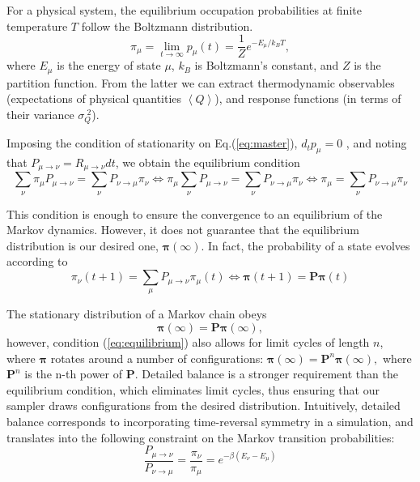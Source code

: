 For a physical system, the equilibrium occupation probabilities at finite temperature $T$ follow the Boltzmann distribution.
\begin{equation}
\pi_\mu = \lim_{t \rightarrow \infty} p_\mu (t) = \frac{1}{Z} e^{ - E_\mu / k_B T} ,
\end{equation}
where $E_\mu$ is the energy of state $\mu$, $k_B$ is Boltzmann's constant, and $Z$ is the partition function. From the latter we can extract thermodynamic observables (expectations of physical quantities $\left\langle Q \right\rangle$), and response functions (in terms of their variance $\sigma_Q^{\,\, 2}$).

Imposing the condition of stationarity on Eq.(\ref{eq:master}), $d_t p_\mu = 0$ , and noting that $ P_{\mu\rightarrow \nu} = R_{\mu\rightarrow \nu}  dt$, we obtain the equilibrium condition
\begin{equation}\label{eq:equilibrium}
\sum_\nu \pi_\mu P_{\mu \rightarrow \nu} = \sum_\nu P_{\nu \rightarrow \mu} \pi_\nu \iff \pi_\mu \sum_\nu P_{\mu \rightarrow \nu} = \sum_\nu P_{\nu \rightarrow \mu} \pi_\nu \iff \pi_\mu = \sum_\nu P_{\nu \rightarrow \mu} \pi_\nu
\end{equation}

This condition is enough to ensure the convergence to an equilibrium of the Markov dynamics.
However, it does not guarantee that the equilibrium distribution is our desired one, $\bm \pi ( \infty)$.
In fact, the probability of a state evolves according to
\begin{equation}
\pi_\nu ( t + 1 ) = \sum_\mu P_{\mu\rightarrow\nu}  \pi_\mu ( t ) \iff \bm \pi ( t + 1 ) = \bm P \bm \pi ( t )
\end{equation}

The stationary distribution of a Markov chain obeys
\begin{equation}
\bm \pi ( \infty ) = \bm P \bm \pi ( \infty ) ,
\end{equation}
however, condition (\ref{eq:equilibrium}) also allows  for limit cycles of length $n$, where $\bm \pi$ rotates around a number of configurations: $
\bm \pi ( \infty ) = \bm P^n \bm \pi ( \infty ) ,
$
 where $\bm P^n$ is the n-th power of $\bm P$.
Detailed balance is a stronger requirement than the equilibrium condition, which eliminates limit cycles, thus ensuring that our sampler draws configurations from the desired distribution.
Intuitively, detailed balance corresponds to incorporating time-reversal symmetry in a simulation, and translates into the following constraint on the Markov transition probabilities:
\begin{equation}\label{eq:markovCondition}
\frac{P_{\mu\rightarrow\nu}}{P_{\nu\rightarrow\mu}} = \frac{\pi_\nu}{\pi_\mu} = e^{-\beta ( E_\nu - E_\mu ) }
\end{equation}

